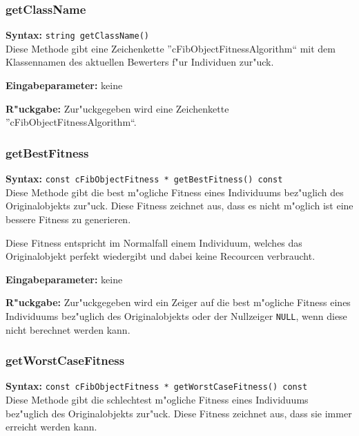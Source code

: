 \subsubsection{getClassName}

\textbf{Syntax:} \verb|string getClassName()| \\

Diese Methode gibt eine Zeichenkette ''cFibObjectFitnessAlgorithm`` mit dem Klassennamen des aktuellen Bewerters f"ur Individuen zur"uck.

\bigskip\noindent
\textbf{Eingabeparameter:} keine

\bigskip\noindent
\textbf{R"uckgabe:} Zur"uckgegeben wird eine Zeichenkette ''cFibObjectFitnessAlgorithm``.


\subsubsection{getBestFitness}

\textbf{Syntax:} \verb|const cFibObjectFitness * getBestFitness() const| \\

Diese Methode gibt die best m"ogliche Fitness eines Individuums bez"uglich des Originalobjekts zur"uck. Diese Fitness zeichnet aus, dass es nicht m"oglich ist eine bessere Fitness zu generieren.

Diese Fitness entspricht im Normalfall einem Individuum, welches das Originalobjekt perfekt wiedergibt und dabei keine Recourcen verbraucht.

\bigskip\noindent
\textbf{Eingabeparameter:} keine

\bigskip\noindent
\textbf{R"uckgabe:} Zur"uckgegeben wird ein Zeiger auf die best m"ogliche Fitness eines Individuums bez"uglich des Originalobjekts oder der Nullzeiger \verb|NULL|, wenn diese nicht berechnet werden kann.


\subsubsection{getWorstCaseFitness}

\textbf{Syntax:} \verb|const cFibObjectFitness * getWorstCaseFitness() const| \\

Diese Methode gibt die schlechtest m"ogliche Fitness eines Individuums bez"uglich des Originalobjekts zur"uck. Diese Fitness zeichnet aus, dass sie immer erreicht werden kann.

